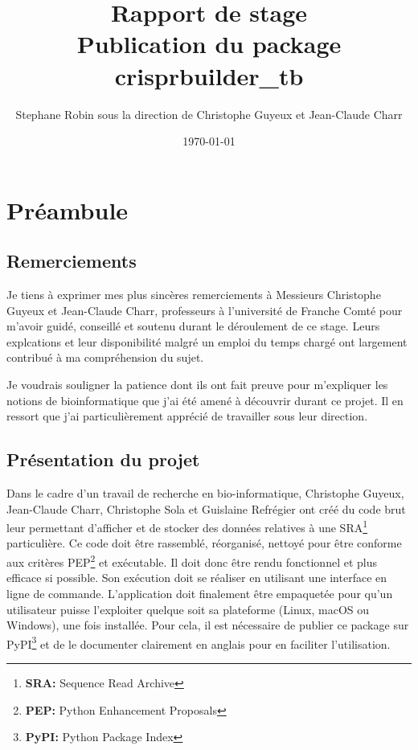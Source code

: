 \documentclass[twoside,a4paper,11pt,frenchb,openany]{report}
\title{\textbf{Rapport de stage \\ Publication du package crisprbuilder\_tb}}
\author{Stephane Robin sous la direction de Christophe Guyeux et Jean-Claude Charr}
\date{\today}
\begin{document}
	
\maketitle



\tableofcontents



\chapter{Préambule}


	
\section{Remerciements}
	
Je tiens à exprimer mes plus sincères remerciements à Messieurs Christophe Guyeux et Jean-Claude Charr, professeurs à l'université de Franche Comté pour m'avoir guidé, conseillé et soutenu durant le déroulement de ce stage. Leurs explcations et leur disponibilité malgré un emploi du temps chargé ont largement contribué à ma compréhension du sujet.

Je voudrais souligner la patience dont ils ont fait preuve pour m'expliquer les notions de bioinformatique que j'ai été amené à découvrir durant ce projet. Il en ressort que j'ai particulièrement apprécié de travailler sous leur direction.





\section{Présentation du projet}

Dans le cadre d'un travail de recherche en bio-informatique, Christophe Guyeux, Jean-Claude Charr, Christophe Sola et Guislaine Refrégier ont créé du code brut leur permettant d'afficher et de stocker des données relatives à une SRA\footnote{\textbf{SRA:} Sequence Read Archive} particulière. Ce code doit être rassemblé, réorganisé, nettoyé pour être conforme aux critères PEP\footnote{\textbf{PEP:} Python Enhancement Proposals} et exécutable. Il doit donc être rendu fonctionnel et plus efficace si possible. Son exécution doit se réaliser en utilisant une interface en ligne de commande. L'application doit finalement être empaquetée pour qu'un utilisateur puisse l'exploiter quelque soit sa plateforme (Linux, macOS ou Windows), une fois installée. Pour cela, il est nécessaire de publier ce package sur PyPI\footnote{\textbf{PyPI:} Python Package Index} et de le documenter clairement en anglais pour en faciliter l'utilisation.
\end{document}
